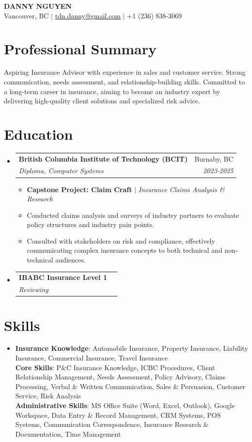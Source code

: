 \documentclass[letterpaper,11pt]{article}
\makeatletter
\newcommand{\resumeItem}[1]{
\item\small{
{#1 \vspace{-2pt}}
}
}
\newcommand{\resumeSubheading}[4]{
\vspace{-2pt}\item
\begin{tabular*}{0.97\textwidth}[t]{l@{\extracolsep{\fill}}r}
\textbf{#1} & #2 \\
\textit{\small#3} & \textit{\small #4} \\
\end{tabular*}\vspace{-7pt}
}
\newcommand{\resumeSubItem}[1]{\resumeItem{#1}\vspace{-4pt}}
\newcommand{\resumeSubHeadingListStart}{\begin{itemize}[leftmargin=0.15in, label={}]}
\newcommand{\resumeSubHeadingListEnd}{\end{itemize}}
\newcommand{\resumeItemListStart}{\begin{itemize}}
\newcommand{\resumeItemListEnd}{\end{itemize}\vspace{-5pt}}
\makeatother
\begin{document}
\begin{center}
\textbf{\Huge \scshape DANNY NGUYEN} \\ \vspace{1pt}
\small Vancouver, BC $|$ \href{mailto:tdn.danny@gmail.com}{\underline{tdn.danny@gmail.com}} $|$ +1 (236) 838-3069
\end{center}


\section{Professional Summary}
Aspiring Insurance Advisor with experience in sales and customer service. Strong communication, needs assessment, and relationship-building skills. Committed to a long-term career in insurance, aiming to become an industry expert by delivering high-quality client solutions and specialized risk advice.

\section{Education}
\resumeSubHeadingListStart
\resumeSubheading{British Columbia Institute of Technology (BCIT)}{Burnaby, BC}{Diploma, Computer Systems}{2023-2025}
\resumeItemListStart
\resumeItem{\textbf{Capstone Project: Claim Craft} $|$ \emph{Insurance Claims Analysis \& Research}}
\resumeSubItem{Conducted claims analysis and surveys of industry partners to evaluate policy structures and industry pain points.}
\resumeSubItem{Consulted with stakeholders on risk and compliance, effectively communicating complex insurance concepts to both technical and non-technical audiences.}
\resumeItemListEnd
\resumeSubheading{IBABC Insurance Level 1}{}{Reviewing}{}
\resumeSubHeadingListEnd

\section{Skills}
\begin{itemize}[leftmargin=0.15in, label={}]
\item{
\textbf{Insurance Knowledge}{: Automobile Insurance, Property Insurance, Liability Insurance, Commercial Insurance, Travel Insurance} \\
\textbf{Core Skills}{: P\&C Insurance Knowledge, ICBC Procedures, Client Relationship Management, Needs Assessment, Policy Advisory, Claims Processing, Verbal \& Written Communication, Sales \& Persuasion, Customer Service, Risk Analysis} \\
\textbf{Administrative Skills}{: MS Office Suite (Word, Excel, Outlook), Google Workspace, Data Entry \& Record Management, CRM Systems, POS Systems, Communication Correspondence, Insurance Research \& Documentation, Time Management}
}
\end{itemize}
\end{document}
